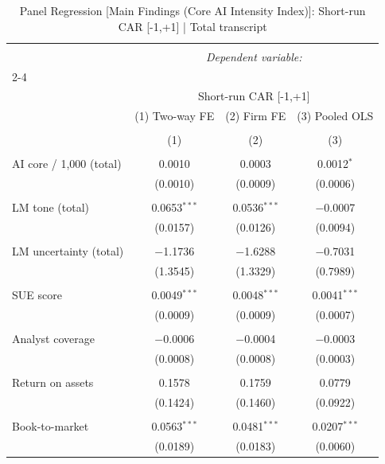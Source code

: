 
\begin{table}[!htbp] \centering 
  \caption{Panel Regression [Main Findings (Core AI Intensity Index)]: Short-run CAR [-1,+1]  |  Total transcript} 
  \label{} 
\begin{tabular}{@{\extracolsep{5pt}}lccc} 
\\[-1.8ex]\hline 
\hline \\[-1.8ex] 
 & \multicolumn{3}{c}{\textit{Dependent variable:}} \\ 
\cline{2-4} 
\\[-1.8ex] & \multicolumn{3}{c}{Short-run CAR [-1,+1]} \\ 
 & (1) Two-way FE & (2) Firm FE & (3) Pooled OLS \\ 
\\[-1.8ex] & (1) & (2) & (3)\\ 
\hline \\[-1.8ex] 
 AI core / 1,000 (total) & 0.0010 & 0.0003 & 0.0012$^{*}$ \\ 
  & (0.0010) & (0.0009) & (0.0006) \\ 
  & & & \\ 
 LM tone (total) & 0.0653$^{***}$ & 0.0536$^{***}$ & $-$0.0007 \\ 
  & (0.0157) & (0.0126) & (0.0094) \\ 
  & & & \\ 
 LM uncertainty (total) & $-$1.1736 & $-$1.6288 & $-$0.7031 \\ 
  & (1.3545) & (1.3329) & (0.7989) \\ 
  & & & \\ 
 SUE score & 0.0049$^{***}$ & 0.0048$^{***}$ & 0.0041$^{***}$ \\ 
  & (0.0009) & (0.0009) & (0.0007) \\ 
  & & & \\ 
 Analyst coverage & $-$0.0006 & $-$0.0004 & $-$0.0003 \\ 
  & (0.0008) & (0.0008) & (0.0003) \\ 
  & & & \\ 
 Return on assets & 0.1578 & 0.1759 & 0.0779 \\ 
  & (0.1424) & (0.1460) & (0.0922) \\ 
  & & & \\ 
 Book-to-market & 0.0563$^{***}$ & 0.0481$^{***}$ & 0.0207$^{***}$ \\ 
  & (0.0189) & (0.0183) & (0.0060) \\ 

\end{tabular}
\end{table}
